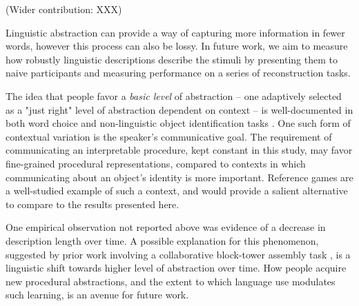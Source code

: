 \documentclass[10pt,letterpaper]{article}
\begin{document}

(Wider contribution: XXX)



Linguistic abstraction can provide a way of capturing more information in fewer words, however this process can also be lossy.
In future work, we aim to measure how robustly linguistic descriptions describe the stimuli by presenting them to naive participants and measuring performance on a series of reconstruction tasks.



The idea that people favor a \textit{basic level} of abstraction -- one adaptively selected as a "just right" level of abstraction dependent on context -- is well-documented in both word choice and non-linguistic object identification tasks .
One such form of contextual variation is the speaker's communicative goal.
The requirement of communicating an interpretable procedure, kept constant in this study, may favor fine-grained procedural representations, compared to contexts in which communicating about an object's identity is more important.
Reference games are a well-studied example of such a context, and would provide a salient alternative to compare to the results presented here.

One empirical observation not reported above was evidence of a decrease in description length over time. 
A possible explanation for this phenomenon, suggested by prior work involving a collaborative block-tower assembly task \cite{mccarthy2021learning}, is a linguistic shift towards higher level of abstraction over time.
How people acquire new procedural abstractions, and the extent to which language use modulates such learning, is an avenue for future work.



\end{document}
